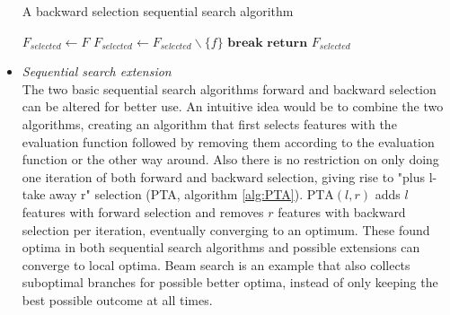 \documentclass[10pt,a4paper]{report}
\begin{document}
\begin{itemize}
		\begin{algorithm}[H]
			\caption{A backward selection sequential search algorithm\cite{Reunanen2006}}\label{alg:BackwardSelection}
			\begin{algorithmic}[1]
				\State $F_{\textit{selected}} \gets F$				
						
				 
				\State $F_{\textit{selected}} \gets F_{\textit{selected}} \backslash \{f\}$ 
				\EndIf
				 
				\State $\textbf{break}$
				\EndIf
				\EndFor
				\State $\textbf{return } F_{\textit{selected}}$
				\EndProcedure
			\end{algorithmic}
		\end{algorithm}
		
		\item \textit{Sequential search extension} \\
		The two basic sequential search algorithms forward and backward selection can be altered for better use. An intuitive idea would be to combine the two algorithms, creating an algorithm that first selects features with the evaluation function followed by removing them according to the evaluation function or the other way around. Also there is no restriction on only doing one iteration of both forward and backward selection, giving rise to "plus l-take away r" selection (PTA, algorithm \ref{alg:PTA}). $\text{PTA}(l, r)$ adds $l$ features with forward selection and removes $r$ features with backward selection per iteration, eventually converging to an optimum. 
		These found optima in both sequential search algorithms and possible extensions can converge to local optima. Beam search is an example that also collects suboptimal branches for possible better optima, instead of only keeping the best possible outcome at all times\cite{Reunanen2006}.
		

\end{itemize}
\end{document}
